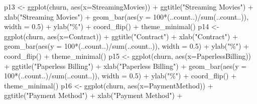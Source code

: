 \documentclass[
]{article}
\newenvironment{Shaded}{\begin{snugshade}}{\end{snugshade}}
\newcommand{\AttributeTok}[1]{\textcolor[rgb]{0.77,0.63,0.00}{#1}}
\newcommand{\DecValTok}[1]{\textcolor[rgb]{0.00,0.00,0.81}{#1}}
\newcommand{\FloatTok}[1]{\textcolor[rgb]{0.00,0.00,0.81}{#1}}
\newcommand{\FunctionTok}[1]{\textcolor[rgb]{0.00,0.00,0.00}{#1}}
\newcommand{\NormalTok}[1]{#1}
\newcommand{\OtherTok}[1]{\textcolor[rgb]{0.56,0.35,0.01}{#1}}
\newcommand{\SpecialCharTok}[1]{\textcolor[rgb]{0.00,0.00,0.00}{#1}}
\newcommand{\StringTok}[1]{\textcolor[rgb]{0.31,0.60,0.02}{#1}}
\begin{document}
\begin{Shaded}
\begin{Highlighting}[]
\NormalTok{p13 }\OtherTok{\textless{}{-}} \FunctionTok{ggplot}\NormalTok{(churn, }\FunctionTok{aes}\NormalTok{(}\AttributeTok{x=}\NormalTok{StreamingMovies)) }\SpecialCharTok{+} \FunctionTok{ggtitle}\NormalTok{(}\StringTok{"Streaming Movies"}\NormalTok{) }\SpecialCharTok{+} \FunctionTok{xlab}\NormalTok{(}\StringTok{"Streaming Movies"}\NormalTok{) }\SpecialCharTok{+}
  \FunctionTok{geom\_bar}\NormalTok{(}\FunctionTok{aes}\NormalTok{(}\AttributeTok{y =} \DecValTok{100}\SpecialCharTok{*}\NormalTok{(..count..)}\SpecialCharTok{/}\FunctionTok{sum}\NormalTok{(..count..)), }\AttributeTok{width =} \FloatTok{0.5}\NormalTok{) }\SpecialCharTok{+} \FunctionTok{ylab}\NormalTok{(}\StringTok{"\%"}\NormalTok{) }\SpecialCharTok{+} \FunctionTok{coord\_flip}\NormalTok{() }\SpecialCharTok{+} \FunctionTok{theme\_minimal}\NormalTok{()}
\NormalTok{p14 }\OtherTok{\textless{}{-}} \FunctionTok{ggplot}\NormalTok{(churn, }\FunctionTok{aes}\NormalTok{(}\AttributeTok{x=}\NormalTok{Contract)) }\SpecialCharTok{+} \FunctionTok{ggtitle}\NormalTok{(}\StringTok{"Contract"}\NormalTok{) }\SpecialCharTok{+} \FunctionTok{xlab}\NormalTok{(}\StringTok{"Contract"}\NormalTok{) }\SpecialCharTok{+} 
  \FunctionTok{geom\_bar}\NormalTok{(}\FunctionTok{aes}\NormalTok{(}\AttributeTok{y =} \DecValTok{100}\SpecialCharTok{*}\NormalTok{(..count..)}\SpecialCharTok{/}\FunctionTok{sum}\NormalTok{(..count..)), }\AttributeTok{width =} \FloatTok{0.5}\NormalTok{) }\SpecialCharTok{+} \FunctionTok{ylab}\NormalTok{(}\StringTok{"\%"}\NormalTok{) }\SpecialCharTok{+} \FunctionTok{coord\_flip}\NormalTok{() }\SpecialCharTok{+} \FunctionTok{theme\_minimal}\NormalTok{()}
\NormalTok{p15 }\OtherTok{\textless{}{-}} \FunctionTok{ggplot}\NormalTok{(churn, }\FunctionTok{aes}\NormalTok{(}\AttributeTok{x=}\NormalTok{PaperlessBilling)) }\SpecialCharTok{+} \FunctionTok{ggtitle}\NormalTok{(}\StringTok{"Paperless Billing"}\NormalTok{) }\SpecialCharTok{+} \FunctionTok{xlab}\NormalTok{(}\StringTok{"Paperless Billing"}\NormalTok{) }\SpecialCharTok{+} 
  \FunctionTok{geom\_bar}\NormalTok{(}\FunctionTok{aes}\NormalTok{(}\AttributeTok{y =} \DecValTok{100}\SpecialCharTok{*}\NormalTok{(..count..)}\SpecialCharTok{/}\FunctionTok{sum}\NormalTok{(..count..)), }\AttributeTok{width =} \FloatTok{0.5}\NormalTok{) }\SpecialCharTok{+} \FunctionTok{ylab}\NormalTok{(}\StringTok{"\%"}\NormalTok{) }\SpecialCharTok{+} \FunctionTok{coord\_flip}\NormalTok{() }\SpecialCharTok{+} \FunctionTok{theme\_minimal}\NormalTok{()}
\NormalTok{p16 }\OtherTok{\textless{}{-}} \FunctionTok{ggplot}\NormalTok{(churn, }\FunctionTok{aes}\NormalTok{(}\AttributeTok{x=}\NormalTok{PaymentMethod)) }\SpecialCharTok{+} \FunctionTok{ggtitle}\NormalTok{(}\StringTok{"Payment Method"}\NormalTok{) }\SpecialCharTok{+} \FunctionTok{xlab}\NormalTok{(}\StringTok{"Payment Method"}\NormalTok{) }\SpecialCharTok{+}

\end{Highlighting}
\end{Shaded}
\end{document}
